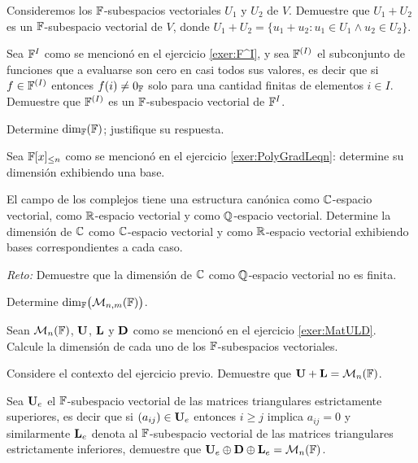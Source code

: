 \begin{exerciselist}
  \item Consideremos los $\mathbb{F}$-subespacios vectoriales $U_1$ y $U_2$ de $V$. Demuestre que $U_1 + U_2$ es un $\mathbb{F}$-subespacio vectorial de $V$, donde $U_1 + U_2 = \{ u_1 + u_2 : u_1 \in U_1 \land u_2 \in U_2 \}.$
  
  \item \label{exer:F^IFinito} Sea $\mathbb{F}^{I}$ como se mencionó en el ejercicio \ref{exer:F^I}, y sea $\mathbb{F}^{(I)}$ el subconjunto de funciones que a evaluarse son cero en casi todos sus valores, es decir que si $f \in \mathbb{F}^{(I)}$ entonces $f(i) \neq 0_{\mathbb{F}}$ solo para una cantidad finitas de elementos $i \in I$. Demuestre que $\mathbb{F}^{(I)}$ es un $\mathbb{F}$-subespacio vectorial de $\mathbb{F}^{I}$.
  
  \item Determine $\dim_{\mathbb{F}}(\mathbb{F})$; justifique su respuesta.
  
  \item Sea $\mathbb{F}[x]_{\leq n}$ como se mencionó en el ejercicio \ref{exer:PolyGradLeqn}: determine su dimensión exhibiendo una base.
  
  \item El campo de los complejos tiene una estructura canónica como $\mathbb{C}$-espacio vectorial, como $\mathbb{R}$-espacio vectorial
  y como $\mathbb{Q}$-espacio vectorial. Determine la dimensión de $\mathbb{C}$ como $\mathbb{C}$-espacio vectorial y como $\mathbb{R}$-espacio vectorial exhibiendo bases correspondientes a cada caso.
  
  \emph{Reto:} Demuestre que la dimensión de $\mathbb{C}$ como $\mathbb{Q}$-espacio vectorial no es finita.
  
  \item Determine $\dim_{\mathbb{F}}\bigl( \mathcal{M}_{n,m}(\mathbb{F}) \bigr)$.
  
  \item Sean $\mathcal{M}_n(\mathbb{F})$, $\mathbf{U}$, $\mathbf{L}$ y $\mathbf{D}$ como se mencionó en el ejercicio \ref{exer:MatULD}. Calcule la dimensión de cada uno de los $\mathbb{F}$-subespacios vectoriales.

  \item Considere el contexto del ejercicio previo. Demuestre que $\mathbf{U} + \mathbf{L} = \mathcal{M}_n(\mathbb{F})$.
  
  \item Sea $\mathbf{U}_e$ el $\mathbb{F}$-subespacio vectorial de las matrices triangulares estrictamente superiores, es decir que si  $(a_{ij}) \in \mathbf{U}_e$ entonces $i \geq j$ implica $a_{ij} = 0$ y similarmente $\mathbf{L}_e$ denota al $\mathbb{F}$-subespacio vectorial de las matrices triangulares estrictamente inferiores, demuestre que $\mathbf{U}_e \oplus \mathbf{D} \oplus \mathbf{L}_e = \mathcal{M}_n(\mathbb{F})$.
  

\end{exerciselist}
